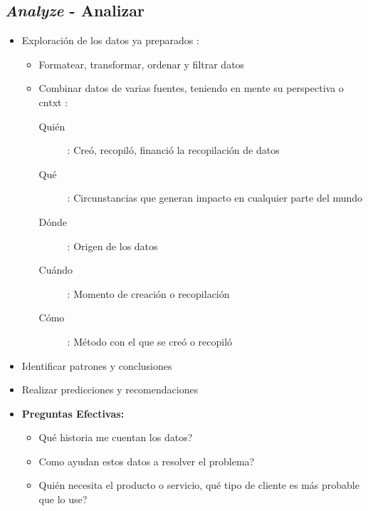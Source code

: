 \subsection{\textit{Analyze} - Analizar}
\begin{itemize}
    \item {Exploración de los datos ya preparados :
    \begin{itemize}
        \item {Formatear, transformar, ordenar y filtrar datos}
        \item {Combinar datos de varias fuentes, teniendo en mente su perspectiva o \gls{cntxt} : 
        \begin{description}
            \item[Quién]{ : Creó, recopiló, financió la recopilación de datos}
            \item[Qué]{ : Circunstancias que generan impacto en cualquier parte del mundo}
            \item[Dónde]{ : Origen de los datos}
            \item[Cuándo]{ : Momento de creación o recopilación} 
            \item[Cómo]{ : Método con el que se creó o recopiló} 
        \end{description}}
    \end{itemize}}
    \item {Identificar patrones y conclusiones}
    \item {Realizar predicciones y recomendaciones}
    \item {\textbf{Preguntas Efectivas:}
    \begin{itemize}
        \item {Qué historia me cuentan los datos?}
        \item {Como ayudan estos datos a resolver el problema?}
        \item {Quién necesita el producto o servicio, qué tipo de cliente es más probable que lo use?}
    \end{itemize}}
\end{itemize}

